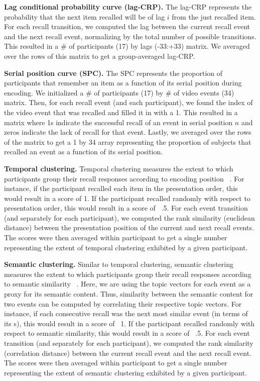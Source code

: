 \documentclass{article}
\begin{document}
\textbf{Lag conditional probability curve (lag-CRP).} The lag-CRP represents the probability that the next item recalled will be of lag $i$ from the just recalled item. For each recall transition, we computed the lag between the current recall event and the next recall event, normalizing by the total number of possible transitions.  This resulted in a \# of participants (17) by lags (-33:+33) matrix. We averaged over the rows of this matrix to get a group-averaged lag-CRP.

\textbf{Serial position curve (SPC).} The SPC represents the proportion of participants that remember an item as a function of its serial position during encoding. We initialized a \# of participants (17) by \# of video events (34) matrix. Then, for each recall event (and each participant), we found the index of the video event that was recalled and filled it in with a 1. This resulted in a matrix where 1s indicate the successful recall of an event in serial position $n$ and zeros indicate the lack of recall for that event.  Lastly, we averaged over the rows of the matrix to get a 1 by 34 array representing the proportion of subjects that recalled an event as a function of its serial position.

\textbf{Temporal clustering.} Temporal clustering measures the extent to which participants group their recall responses according to encoding position ~\citep{PolyEtal09}. For instance, if the participant recalled each item in the presentation order, this would result in a score of 1. If the participant recalled randomly with respect to presentation order, this would result in a score of ~.5.  For each event transition (and separately for each participant), we computed the rank similarity (euclidean distance) between the presentation position  of the current and next recall events. The scores were then averaged within participant to get a single number representing the extent of temporal clustering exhibited by a given participant.

\textbf{Semantic clustering.} Similar to temporal clustering, semantic clustering measures the extent to which participants group their recall responses according to semantic similarity ~\citep{PolyEtal09}. Here, we are using the topic vectors for each event as a proxy for its semantic content. Thus, similarity between the semantic content for two events can be computed by correlating their respective topic vectors.  For instance, if each consecutive recall was the next most similar event (in terms of its s), this would result in a score of ~1. If the participant recalled randomly with respect to semantic similarity, this would result in a score of ~.5.  For each event transition (and separately for each participant), we computed the rank similarity (correlation distance) between the current recall event and the next recall event. The scores were then averaged within participant to get a single number representing the extent of semantic clustering exhibited by a given participant.
\end{document}
